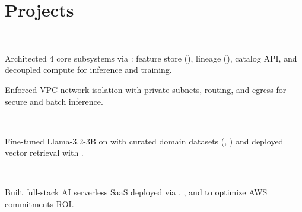 \documentclass{tex/deedy-resume-openfont}
\begin{document}
\begin{minipage}[t]{0.67\textwidth}

\section{Projects}

\\
\begin{tightemize}
    \item Architected 4 core subsystems via : feature store (), lineage (), catalog API, and decoupled compute for inference and training.
    \item Enforced VPC network isolation with private subnets,  routing, and  egress for secure  and batch inference.
\end{tightemize}
\sectionsep

\\
\begin{tightemize}
    \item Fine-tuned Llama-3.2-3B on  with curated domain datasets (, ) and deployed vector retrieval with .
\end{tightemize}
\sectionsep

\\
\begin{tightemize}
    \item Built full-stack AI serverless SaaS deployed via , , and  to optimize AWS commitments ROI.
\end{tightemize}

\end{minipage} 
\end{document}
